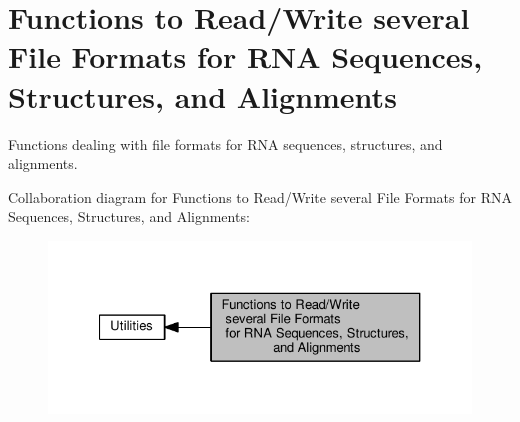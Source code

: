 \hypertarget{group__file__utils}{}\section{Functions to Read/\+Write several File Formats for R\+NA Sequences, Structures, and Alignments}
\label{group__file__utils}


Functions dealing with file formats for R\+NA sequences, structures, and alignments.  


Collaboration diagram for Functions to Read/\+Write several File Formats for R\+NA Sequences, Structures, and Alignments\+:
\nopagebreak
\begin{figure}[H]
\begin{center}
\leavevmode
\includegraphics[width=327pt]{group__file__utils}
\end{center}
\end{figure}
